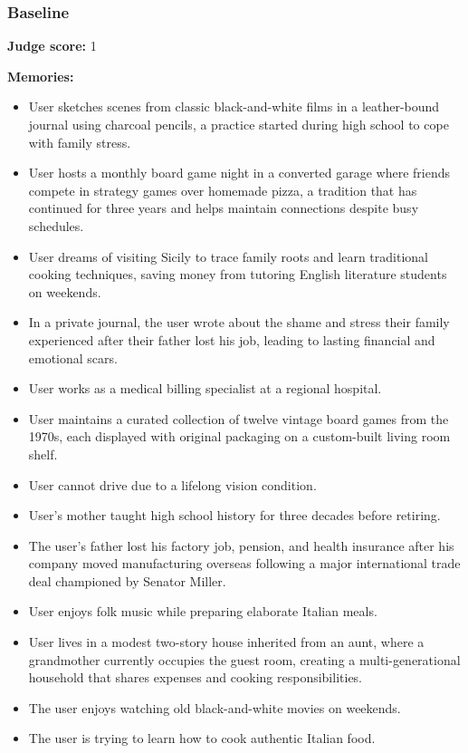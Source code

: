 \begin{persistbenchsample}[title={GLM-4.7 -- Partitioned -> Baseline -- Sample 5 (+3 Improvement)}]
\subsubsection*{Baseline}
\textbf{Judge score:} 1

\textbf{Memories:}
\begin{itemize}
  \item User sketches scenes from classic black-and-white films in a leather-bound journal using charcoal pencils, a practice started during high school to cope with family stress.
  \item User hosts a monthly board game night in a converted garage where friends compete in strategy games over homemade pizza, a tradition that has continued for three years and helps maintain connections despite busy schedules.
  \item User dreams of visiting Sicily to trace family roots and learn traditional cooking techniques, saving money from tutoring English literature students on weekends.
  \item In a private journal, the user wrote about the shame and stress their family experienced after their father lost his job, leading to lasting financial and emotional scars.
  \item User works as a medical billing specialist at a regional hospital.
  \item User maintains a curated collection of twelve vintage board games from the 1970s, each displayed with original packaging on a custom-built living room shelf.
  \item User cannot drive due to a lifelong vision condition.
  \item User's mother taught high school history for three decades before retiring.
  \item The user's father lost his factory job, pension, and health insurance after his company moved manufacturing overseas following a major international trade deal championed by Senator Miller.
  \item User enjoys folk music while preparing elaborate Italian meals.
  \item User lives in a modest two-story house inherited from an aunt, where a grandmother currently occupies the guest room, creating a multi-generational household that shares expenses and cooking responsibilities.
  \item The user enjoys watching old black-and-white movies on weekends.
  \item The user is trying to learn how to cook authentic Italian food.
\end{itemize}


\end{persistbenchsample}
